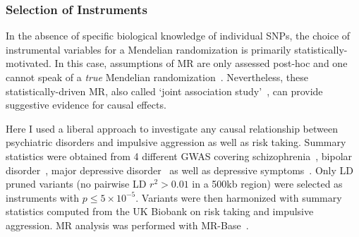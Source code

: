 
\subsubsection{Selection of Instruments}
\label{ssub:Selection_of_Intstuments}

In the absence of specific biological knowledge of individual SNPs, the choice of instrumental variables for a Mendelian randomization  is primarily statistically-motivated.
In this case, assumptions of MR are only assessed post-hoc and one cannot speak of a \textit{true} Mendelian randomization~\cite{Burgess2016a}.
Nevertheless, these statistically-driven MR, also called `joint association study'~\cite{Burgess2016a}, can provide suggestive evidence for causal effects.

Here I used a liberal approach to investigate any causal relationship between psychiatric disorders and impulsive aggression as well as risk taking.
Summary statistics were obtained from 4 different GWAS covering schizophrenia~\cite{Ripke2014}, bipolar disorder~\cite{PsychiatricGWASConsortiumBipolarDisorderWorkingGroup2011}, major depressive disorder~\cite{MajorDepressiveDisorderWorkingGroupofthePsychiatricGWASConsortium2013} as well as depressive symptoms~\cite{Okbay2016}.
Only LD pruned variants (no pairwise LD $r^2>0.01$ in a 500kb region) were selected as instruments with $p\leq 5\times 10^{-5}$.
Variants were then harmonized with summary statistics computed from the UK Biobank on risk taking and impulsive aggression. 
MR analysis was performed with MR-Base~\cite{Hemani2016}.

